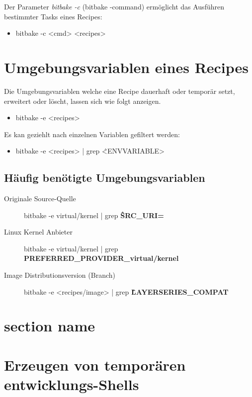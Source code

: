 Der Parameter \textit{bitbake -c} (bitbake -command) ermöglicht das Ausführen
bestimmter Tasks eines Recipes:

\begin{itemize}
    \item bitbake -c <cmd> <recipes>
\end{itemize}


\section{Umgebungsvariablen eines Recipes}%
\label{sec:umgebungsvariablen_eines_recipes}
Die Umgebungsvariablen welche eine Recipe dauerhaft oder temporär setzt,
erweitert oder löscht, lassen sich wie folgt anzeigen.
\begin{itemize}
    \item bitbake -e <recipes>
\end{itemize}

Es kan geziehlt nach einzelnen Variablen gefiltert werden:

\begin{itemize}
    \item bitbake -e <recipes> | grep \^<ENVVARIABLE>
\end{itemize}

\subsection{Häufig benötigte Umgebungsvariablen}%
\label{sub:haufig_gesucht_umgebungsvariablen}

\begin{description}
    \item[Originale Source-Quelle] bitbake -e virtual/kernel | grep \textbf{\^SRC\_URI=}
    \item[Linux Kernel Anbieter]bitbake -e virtual/kernel | grep \textbf{
            \glqq PREFERRED\_PROVIDER\_virtual/kernel\grqq}
    \item[Image Distributionsversion (Branch)] bitbake -e <recipes/image> | grep
        \textbf{\^LAYERSERIES\_COMPAT}
\end{description}

\section{section name}%
\label{sec:section_name}




\section{Erzeugen von temporären entwicklungs-Shells}%
\label{sec:temporaten_entwicklungs_shells}

